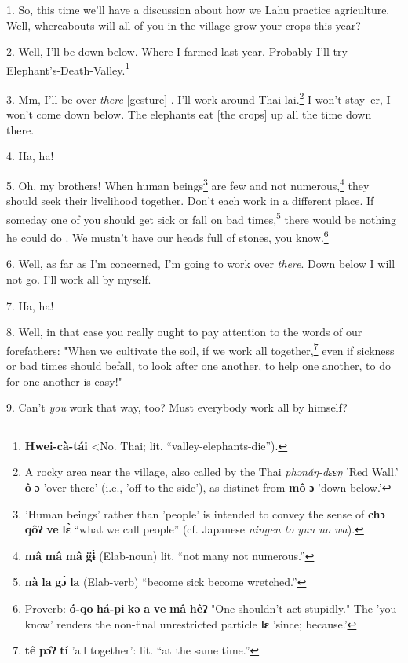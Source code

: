 \setcounter{footnote}{0}

1. So, this time we'll have a discussion about how we Lahu practice agriculture.
Well, whereabouts will all of you in the village grow your crops this year?

2. Well, I'll be down below. Where I farmed last year. Probably I'll try Elephant's-Death-Valley.\footnote{\textbf{Hwei-cà-tái} <No. Thai; lit. ``valley-elephants-die'').}

3. Mm, I'll be over \textit{there} [gesture] . I'll work around Thai-lai.\footnote{A rocky area near the village, also called by the Thai \textit{phənǎŋ-dɛɛŋ} 'Red Wall.' \textbf{ô} \textbf{ɔ} 'over there' (i.e., 'off to the side'), as distinct from \textbf{mô} \textbf{ɔ} 'down below.'}
I won't stay--er, I won't come down below. The elephants eat [the crops] up all
the time down there.

4. Ha, ha!

5. Oh, my brothers! When human beings\footnote{'Human beings' rather than 'people' is intended to convey the sense of \textbf{chɔ} \textbf{qôʔ} \textbf{ve} \textbf{lɛ̀} ``what we call people'' (cf. Japanese \textit{ningen to yuu no wa}).} are few and not numerous,\footnote{\textbf{mâ} \textbf{mâ} \textbf{mâ} \textbf{g̈ɨ̀} (Elab-noun) lit. ``not many not numerous.''} they should
seek their livelihood together. Don't each work in a different place. If someday
one of you should get sick or fall on bad times,\footnote{\textbf{nà} \textbf{la} \textbf{gɔ̀} \textbf{la} (Elab-verb) ``become sick become wretched.''} there would be nothing he
could do . We mustn't have our heads full of stones, you know.\footnote{Proverb: \textbf{ó-qo} \textbf{há-pɨ} \textbf{kə} \textbf{a} \textbf{ve} \textbf{mâ} \textbf{hêʔ} "One shouldn't act stupidly." The 'you know' renders the non-final unrestricted particle \textbf{lɛ} 'since; because.'}

6. Well, as far as I'm concerned, I'm going to work over \textit{there}. Down below
I will not go. I'll work all by myself.

7. Ha, ha!

8. Well, in that case you really ought to pay attention to the words of our forefathers:
"When we cultivate the soil, if we work all together,\footnote{\textbf{tê} \textbf{pɔ̂ʔ} \textbf{tí} 'all together': lit. ``at the same time.''} even if sickness
or bad times should befall, to look after one another, to help one another, to
do for one another is easy!"

9. Can't \textit{you} work that way, too? Must everybody work all by himself?

